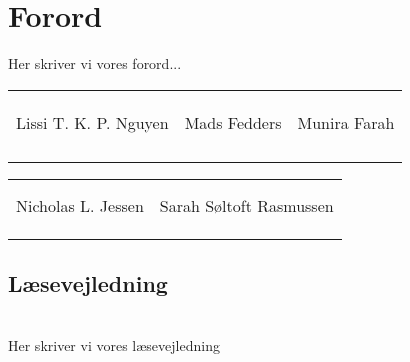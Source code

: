 \chapter*{Forord}
Her skriver vi vores forord...


\phantom{Luft}
\phantom{Luft}
\phantom{Luft}
\phantom{Luft}
\phantom{Luft}
\phantom{Luft}

\begin{table}[H]
	\centering
		\begin{tabular}{c c c}
		&&\\
			\underline{\phantom{mmmmmmmmmmmmmm}} & \underline{\phantom{mmmmmmmmmmmmmm}} & \underline{\phantom{mmmmmmmmmmmmmm}} \\ \\
			Lissi T. K. P. Nguyen			& Mads Fedders 		& Munira Farah 			\\
			&&\\
			&&\\
			&&\\
			&&\\
			
		 																				
																					
		\end{tabular}
		\begin{tabular}{c c}
		     &  \\
		     \underline{\phantom{mmmmmmmmmmmmmm}} & \underline{\phantom{mmmmmmmmmmmmmm}} & \\
			Nicholas L. Jessen			& Sarah Søltoft	Rasmussen		\\
			&&\\
			&&\\
		     & 
		\end{tabular}
\end{table}

\newpage


\section*{Læsevejledning} \\ 
Her skriver vi vores læsevejledning